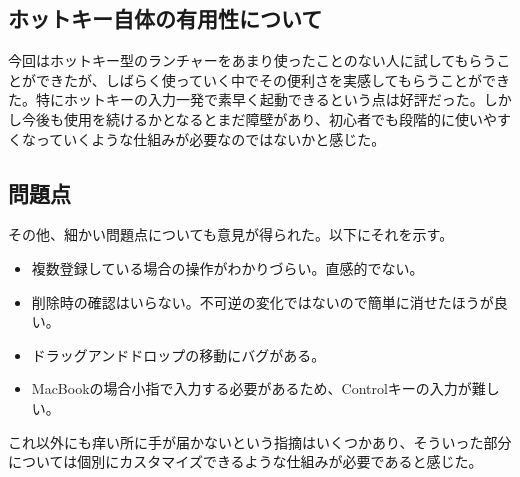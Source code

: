 \subsection{ホットキー自体の有用性について}
今回はホットキー型のランチャーをあまり使ったことのない人に試してもらうことができたが、しばらく使っていく中でその便利さを実感してもらうことができた。特にホットキーの入力一発で素早く起動できるという点は好評だった。しかし今後も使用を続けるかとなるとまだ障壁があり、初心者でも段階的に使いやすくなっていくような仕組みが必要なのではないかと感じた。

\subsection{問題点}
その他、細かい問題点についても意見が得られた。以下にそれを示す。
\begin{itemize}
  \item 複数登録している場合の操作がわかりづらい。直感的でない。
  \item 削除時の確認はいらない。不可逆の変化ではないので簡単に消せたほうが良い。
  \item ドラッグアンドドロップの移動にバグがある。
  \item MacBookの場合小指で入力する必要があるため、Controlキーの入力が難しい。
\end{itemize}
これ以外にも痒い所に手が届かないという指摘はいくつかあり、そういった部分については個別にカスタマイズできるような仕組みが必要であると感じた。